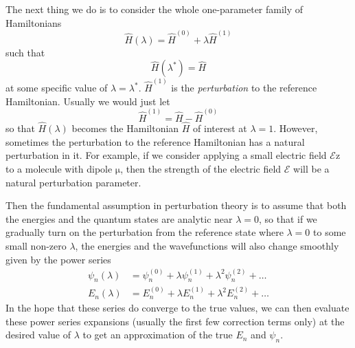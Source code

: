 \documentclass{article}
\theoremstyle{plain}\theoremheaderfont{\normalfont\itshape}\theorembodyfont{\rmfamily}\theoremseparator{.}\newtheorem*{rem}{Remark}\newtheorem*{ex}{Example}\newtheorem*{proof}{Proof}\newtheorem*{altp}{Alternative proof}
\theoremstyle{plain}\theoremheaderfont{\normalfont\bfseries}\theorembodyfont{\rmfamily}\theoremseparator{.}\newtheorem{thm}{Theorem}[section]\newtheorem{lem}[thm]{Lemma}\newtheorem{prop}[thm]{Proposition}\newtheorem*{cor}{Corollary}\newtheorem{defn}[thm]{Definition}\newtheorem{clm}[thm]{Claim}\newtheorem{clminproof}{Claim}
\theoremstyle{break}\theoremheaderfont{\normalfont\itshape}\theorembodyfont{\rmfamily}\theoremseparator{.\medskip}\newtheorem*{proofskip}{Proof}\newtheorem*{exs}{Examples}\newtheorem*{rems}{Remarks}
\theoremstyle{break}\theoremheaderfont{\normalfont\bfseries}\theorembodyfont{\rmfamily}\theoremseparator{.\medskip}\newtheorem{lemskip}[thm]{Lemma}\newtheorem{defnskip}[thm]{Definition}\newtheorem{propskip}[thm]{Proposition}\newtheorem{thmskip}[thm]{Theorem}
\numberwithin{equation}{section}
\newcommand{\vb}[1]{\bm{\mathrm{#1}}}
\newcommand{\vu}[1]{\hat{\bm{\mathrm{#1}}}}
\begin{document}
    The next thing we do is to consider the whole one-parameter family of Hamiltonians
    \begin{equation}
        \hat{H}(\lambda)=\hat{H}^{(0)}+\lambda\hat{H}^{(1)}
    \end{equation}
    such that
    \begin{equation}
        \hat{H}(\lambda^*)=\hat{H}
    \end{equation}
    at some specific value of \(\lambda=\lambda^*\). \(\hat{H}^{(1)}\) is the \textit{perturbation} to the reference Hamiltonian. Usually we would just let
    \begin{equation}
        \hat{H}^{(1)}=\hat{H}-\hat{H}^{(0)}
    \end{equation}
    so that \(\hat{H}(\lambda)\) becomes the Hamiltonian \(\hat{H}\) of interest at \(\lambda=1\). However, sometimes the perturbation to the reference Hamiltonian has a natural perturbation in it. For example, if we consider applying a small electric field \(\mathcal{E}\vu{z}\) to a molecule with dipole \(\vb{\mu}\), then the strength of the electric field \(\mathcal{E}\) will be a natural perturbation parameter.

    Then the fundamental assumption in perturbation theory is to assume that both the energies and the quantum states are analytic near \(\lambda=0\), so that if we gradually turn on the perturbation from the reference state where \(\lambda=0\) to some small non-zero \(\lambda\), the energies and the wavefunctions will also change smoothly given by the power series
    \begin{align}
        \psi_n(\lambda)&=\psi_n^{(0)}+\lambda\psi_n^{(1)}+\lambda^2\psi_n^{(2)}+\dots \label{state_expansion}\\
        E_n(\lambda)&=E_n^{(0)}+\lambda E_n^{(1)}+\lambda^2 E_n^{(2)}+\dots \label{energy_expansion}
    \end{align}
    In the hope that these series do converge to the true values, we can then evaluate these power series expansions (usually the first few correction terms only) at the desired value of \(\lambda\) to get an approximation of the true \(E_n\) and \(\psi_n\).
\end{document}
